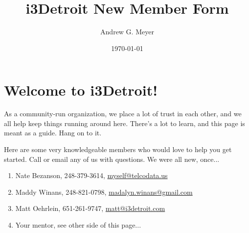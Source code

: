 \documentclass[10pt,letterpaper]{article}
\author{Andrew G. Meyer}
\title{i3Detroit New Member Form}
\date{\today}
\begin{document}
    \section*{\centering Welcome to i3Detroit!}
\noindent
As a community-run organization, we place a lot of trust in each other, and we all help keep things running around here. There's a lot to learn, and this page is meant as a guide. Hang on to it.

\noindent
Here are some very knowledgeable members who would love to help you get started. Call or email any of us with questions. We were all new, once...

    \begin{enumerate}
        \item Nate Bezanson, 248-379-3614, \href{mailto:myself@telcodata.us}{myself@telcodata.us}
        \item Maddy Winans, 248-821-0798, \href{mailto:madalyn.winans@gmail.com}{madalyn.winans@gmail.com}
        \item Matt Oehrlein, 651-261-9747, \href{mailto:matt@i3detroit.com}{matt@i3detroit.com}
        \item Your mentor, see other side of this page...
    \end{enumerate}
\end{document}
